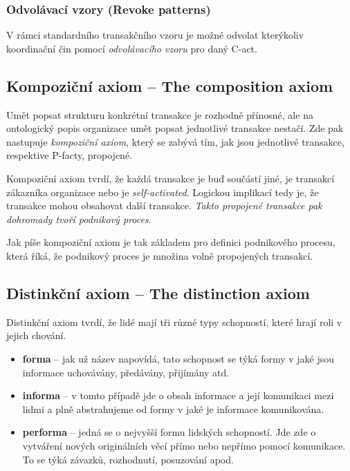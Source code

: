 \subsubsection{Odvolávací vzory (Revoke patterns)}
V rámci standardního transakčního vzoru je možné odvolat kterýkoliv koordinační čin pomocí \textit{odvolávacího vzoru} pro daný C-act.

\subsection{Kompoziční axiom – The composition axiom} \label{sec:kompozicni_axiom}
Umět popsat strukturu konkrétní transakce je rozhodně přínosné, ale na ontologický popis organizace umět popsat jednotlivé transakce nestačí. Zde pak nastupuje \textit{kompoziční axiom}, který se zabývá tím, jak jsou jednotlivé transakce, respektive P-facty, propojené.

Kompoziční axiom tvrdí, že každá transakce je buď součástí jiné, je transakcí zákazníka organizace nebo je \textit{self-activated}. Logickou implikací tedy je, že transakce mohou obsahovat další transakce. \textit{Takto propojené transakce pak dohromady tvoří podnikový proces.}

Jak píše \cite{Dietz2006} kompoziční axiom je tak základem pro definici podnikového procesu, která říká, že podnikový proces je množina volně propojených transakcí. 

\subsection{Distinkční axiom – The distinction axiom} \label{sec:distinction_axiom}
Distinkční axiom tvrdí, že lidé mají tři různé typy schopností, které hrají roli v jejich chování.

\begin{itemize}
\item \textbf{forma} – jak už název napovídá, tato schopnost se týká formy v jaké jsou informace uchovávány, předávány, přijímány atd.
\item \textbf{informa} – v tomto případě jde o obsah informace a její komunikaci mezi lidmi a plně abstrahujeme od formy v jaké je informace komunikována.
\item \textbf{performa} – jedná se o nejvyšší formu lidských schopností. Jde zde o vytváření nových originálních věcí přímo nebo nepřímo pomocí komunikace. To se týká závazků, rozhodnutí, posuzování apod.
\end{itemize}

